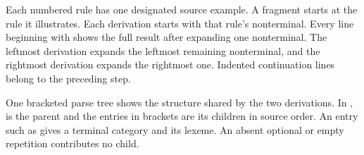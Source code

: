 Each numbered rule has one designated source example. A fragment starts at the rule it illustrates. Each derivation starts with that rule's nonterminal. Every line beginning with \codeinline{=>} shows the full result after expanding one nonterminal. The leftmost derivation expands the leftmost remaining nonterminal, and the rightmost derivation expands the rightmost one. Indented continuation lines belong to the preceding step.

One bracketed parse tree shows the structure shared by the two derivations. In ,  is the parent and the entries in brackets are its children in source order. An entry such as  gives a terminal category and its lexeme. An absent optional or empty repetition contributes no child.


